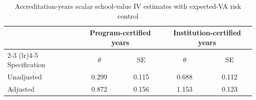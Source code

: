 \begin{table}[!htbp]
\centering
\caption{Accreditation-years scalar school-value IV estimates with expected-VA risk control}
\label{tab:scalar_school_value_iv_accreditation_expected_va}
\begin{tabular}{lcccc}
\toprule
 & \multicolumn{2}{c}{Program-certified years} & \multicolumn{2}{c}{Institution-certified years} \\
\cmidrule(lr){2-3} \cmidrule(lr){4-5}
Specification & $\theta$ & SE & $\theta$ & SE \\
\midrule
Unadjusted & 0.299 & 0.115 & 0.688 & 0.112 \\
Adjusted & 0.872 & 0.156 & 1.153 & 0.123 \\
\bottomrule
\end{tabular}
\end{table}
